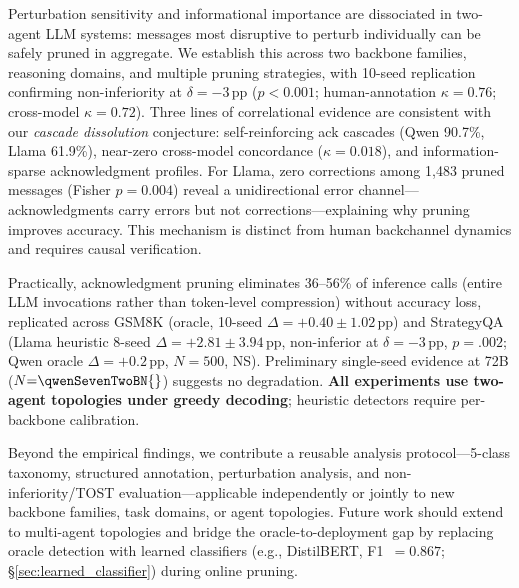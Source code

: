 Perturbation sensitivity and informational importance are dissociated in two-agent LLM systems: messages most disruptive to perturb individually can be safely pruned in aggregate. We establish this across two backbone families, \numValidatedDomains{} reasoning domains, and multiple pruning strategies, with 10-seed replication confirming non-inferiority at $\delta = -3$\,pp ($p < 0.001$; human-annotation $\kappa = 0.76$; cross-model $\kappa = 0.72$). Three lines of correlational evidence are consistent with our \emph{cascade dissolution} conjecture: self-reinforcing ack cascades (Qwen 90.7\%, Llama 61.9\%), near-zero cross-model concordance ($\kappa = 0.018$), and information-sparse acknowledgment profiles. For Llama, zero corrections among 1{,}483 pruned messages (Fisher $p = 0.004$) reveal a unidirectional error channel---acknowledgments carry errors but not corrections---explaining why pruning improves accuracy. This mechanism is distinct from human backchannel dynamics and requires causal verification.

Practically, acknowledgment pruning eliminates 36--56\% of inference calls (entire LLM invocations rather than token-level compression) without accuracy loss, replicated across GSM8K (oracle, 10-seed $\Delta = +0.40 \pm 1.02$\,pp) and StrategyQA (Llama heuristic 8-seed $\Delta = +2.81 \pm 3.94$\,pp, non-inferior at $\delta = -3$\,pp, $p = .002$; Qwen oracle $\Delta = +0.2$\,pp, $N{=}500$, NS). Preliminary single-seed evidence at 72B ($N{=}\qwenSevenTwoBN{}$) suggests no degradation. \textbf{All experiments use two-agent topologies under greedy decoding}; heuristic detectors require per-backbone calibration.

Beyond the empirical findings, we contribute a reusable analysis protocol---5-class taxonomy, structured annotation, perturbation analysis, and non-inferiority/TOST evaluation---applicable independently or jointly to new backbone families, task domains, or agent topologies. Future work should extend to multi-agent topologies and bridge the oracle-to-deployment gap by replacing oracle detection with learned classifiers (e.g., DistilBERT, F1~$= 0.867$; \S\ref{sec:learned_classifier}) during online pruning.
